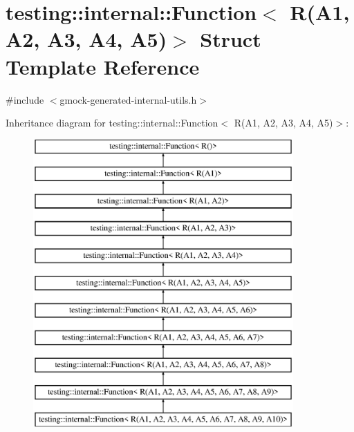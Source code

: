 \hypertarget{structtesting_1_1internal_1_1_function_3_01_r_07_a1_00_01_a2_00_01_a3_00_01_a4_00_01_a5_08_4}{}\section{testing\+::internal\+::Function$<$ R(A1, A2, A3, A4, A5)$>$ Struct Template Reference}
\label{structtesting_1_1internal_1_1_function_3_01_r_07_a1_00_01_a2_00_01_a3_00_01_a4_00_01_a5_08_4}


{\ttfamily \#include $<$gmock-\/generated-\/internal-\/utils.\+h$>$}

Inheritance diagram for testing\+::internal\+::Function$<$ R(A1, A2, A3, A4, A5)$>$\+:\begin{figure}[H]
\begin{center}
\leavevmode
\includegraphics[height=11.000000cm]{d6/d09/structtesting_1_1internal_1_1_function_3_01_r_07_a1_00_01_a2_00_01_a3_00_01_a4_00_01_a5_08_4}
\end{center}
\end{figure}
